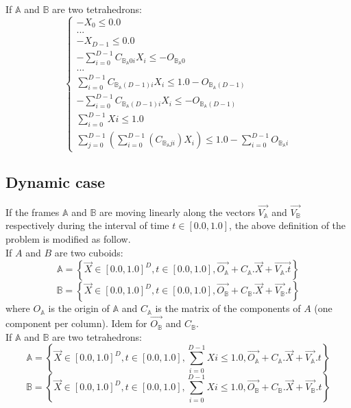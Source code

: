 \documentclass[12pt, a4paper]{article}
\begin{document}
If $\mathbb{A}$ and $\mathbb{B}$ are two tetrahedrons:
\begin{equation}
\left\lbrace
\begin{array}{c}
-X_0\le0.0\\
...\\
-X_{D-1}\le0.0\\
-\sum_{i=0}^{D-1}C_{\mathbb{B}_\mathbb{A}0i}X_i\le-O_{\mathbb{B}_\mathbb{A}0}\\
...\\
\sum_{i=0}^{D-1}C_{\mathbb{B}_\mathbb{A}(D-1)i}X_i\le1.0-O_{\mathbb{B}_\mathbb{A}(D-1)}\\
-\sum_{i=0}^{D-1}C_{\mathbb{B}_\mathbb{A}(D-1)i}X_i\le-O_{\mathbb{B}_\mathbb{A}(D-1)}\\
\sum_{i=0}^{D-1}Xi\le1.0\\
\sum_{j=0}^{D-1}\left(\sum_{i=0}^{D-1}\left(C_{\mathbb{B}_\mathbb{A}ji}\right)X_i\right)\le1.0-\sum_{i=0}^{D-1}O_{\mathbb{B}_\mathbb{A}i}
\end{array}
\right.
\end{equation}

\subsection{Dynamic case}

If the frames $\mathbb{A}$ and $\mathbb{B}$ are moving linearly along the vectors $\overrightarrow{V_\mathbb{A}}$ and $\overrightarrow{V_\mathbb{B}}$ respectively during the interval of time $t\in[0.0,1.0]$, the above definition of the problem is modified as follow.\\

If $A$ and $B$ are two cuboids:
\begin{equation}
\mathbb{A}=\left\lbrace\overrightarrow{X}\in[0.0,1.0]^D,t\in[0.0,1.0],\overrightarrow{O_\mathbb{A}}+C_\mathbb{A}.\overrightarrow{X}+\overrightarrow{V_\mathbb{A}.t}\right\rbrace
\end{equation}
\begin{equation}
\mathbb{B}=\left\lbrace\overrightarrow{X}\in[0.0,1.0]^D,t\in[0.0,1.0],\overrightarrow{O_\mathbb{B}}+C_\mathbb{B}.\overrightarrow{X}+\overrightarrow{V_\mathbb{B}}.t\right\rbrace
\end{equation}
where $O_\mathbb{A}$ is the origin of $\mathbb{A}$ and $C_\mathbb{A}$ is the matrix of the components of $A$ (one component per column). Idem for $\overrightarrow{O_\mathbb{B}}$ and $C_\mathbb{B}$.\\

If $\mathbb{A}$ and $\mathbb{B}$ are two tetrahedrons:
\begin{equation}
\mathbb{A}=\left\lbrace\overrightarrow{X}\in[0.0,1.0]^D,t\in[0.0,1.0],\sum_{i=0}^{D-1}Xi\le1.0,\overrightarrow{O_\mathbb{A}}+C_\mathbb{A}.\overrightarrow{X}+\overrightarrow{V_\mathbb{A}}.t\right\rbrace
\end{equation}
\begin{equation}
\mathbb{B}=\left\lbrace\overrightarrow{X}\in[0.0,1.0]^D,t\in[0.0,1.0],\sum_{i=0}^{D-1}Xi\le1.0,\overrightarrow{O_\mathbb{B}}+C_\mathbb{B}.\overrightarrow{X}+\overrightarrow{V_\mathbb{B}}.t\right\rbrace
\end{equation}
\end{document}
